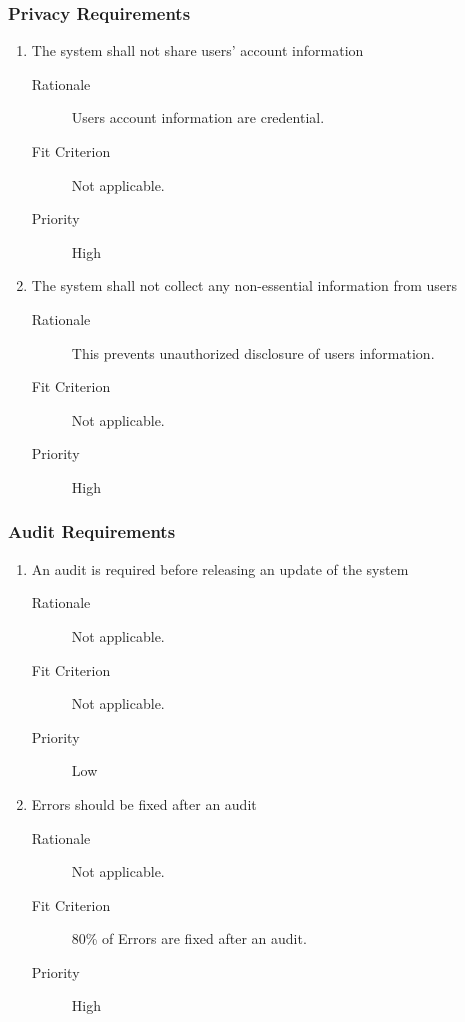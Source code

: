 \documentclass[12pt, titlepage]{article}
\begin{document}
\subsubsection{Privacy Requirements}
\begin{enumerate}[resume*=NFR]
\item The system shall not share users’ account information
  \begin{description}
  \item[Rationale] Users account information are credential.
  \item[Fit Criterion] Not applicable.
  \item[Priority] High
  \end{description}

\item The system shall not collect any non-essential information from users
  \begin{description}
  \item[Rationale] This prevents unauthorized disclosure of users information.
  \item[Fit Criterion] Not applicable.
  \item[Priority] High
  \end{description}

\end{enumerate}

\subsubsection{Audit Requirements}
\begin{enumerate}[resume*=NFR]
\item An audit is required before releasing an update of the system
  \begin{description}
  \item[Rationale] Not applicable.
  \item[Fit Criterion] Not applicable.
  \item[Priority] Low
  \end{description}

\item Errors should be fixed after an audit
  \begin{description}
  \item[Rationale] Not applicable.
  \item[Fit Criterion] 80\% of Errors are fixed after an audit.
  \item[Priority] High
  \end{description}

\end{enumerate}
\end{document}
